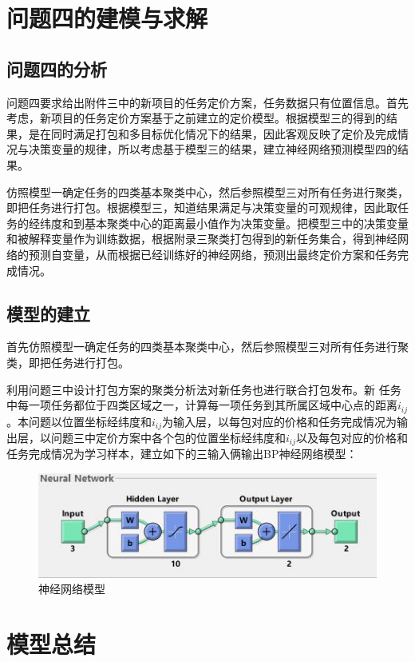 \documentclass[withoutpreface,bwprint]{cumcmthesis} %
\begin{document}



\section{问题四的建模与求解}
\subsection{问题四的分析}
问题四要求给出附件三中的新项目的任务定价方案，任务数据只有位置信息。首先考虑，新项目的任务定价方案基于之前建立的定价模型。根据模型三的得到的结果，是在同时满足打包和多目标优化情况下的结果，因此客观反映了定价及完成情况与决策变量的规律，所以考虑基于模型三的结果，建立神经网络预测模型四的结果。

仿照模型一确定任务的四类基本聚类中心，然后参照模型三对所有任务进行聚类，即把任务进行打包。根据模型三，知道结果满足与决策变量的可观规律，因此取任务的经纬度和到基本聚类中心的距离最小值作为决策变量。把模型三中的决策变量和被解释变量作为训练数据，根据附录三聚类打包得到的新任务集合，得到神经网络的预测自变量，从而根据已经训练好的神经网络，预测出最终定价方案和任务完成情况。

\subsection{模型的建立}
首先仿照模型一确定任务的四类基本聚类中心，然后参照模型三对所有任务进行聚类，即把任务进行打包。

利用问题三中设计打包方案的聚类分析法对新任务也进行联合打包发布。新
任务中每一项任务都位于四类区域之一，计算每一项任务到其所属区域中心点的距离$i_{ij}$。本问题以位置坐标经纬度和$i_{ij}$为输入层，以每包对应的价格和任务完成情况为输出层，以问题三中定价方案中各个包的位置坐标经纬度和$i_{ij}$以及每包对应的价格和任务完成情况为学习样本，建立如下的三输入俩输出BP神经网络模型：
\begin{figure}[H]
    \centering
    \includegraphics[width=1\textwidth]{3.jpg}
    \caption{神经网络模型}
    \label{图}
\end{figure}


\section{模型总结}
\end{document}
